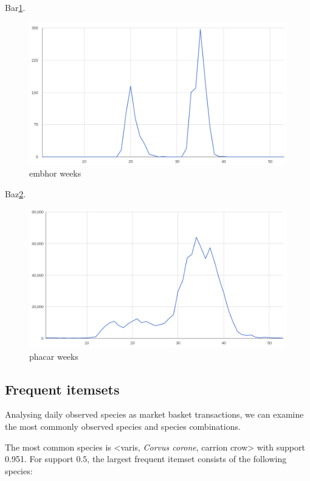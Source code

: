 \documentclass[english]{tktltiki2}
\begin{document}
Bar\ref{fig: embhor_weeks}.

\begin{figure}[htb]
\centering
\includegraphics[clip=true, width=\textwidth]{embhor_weeks}
\caption{embhor weeks}
\label{fig: embhor_weeks}
\end{figure}

Baz\ref{fig: phacar_weeks}.

\begin{figure}[htb]
\centering
\includegraphics[clip=true, width=\textwidth]{phacar_weeks}
\caption{phacar weeks}
\label{fig: phacar_weeks}
\end{figure}


\subsection{Frequent itemsets}

Analysing daily observed species as market basket transactions, we can examine the most commonly observed species and species combinations.

The most common species is <varis, \emph{Corvus corone}, carrion crow> with support 0.951. For support $0.5$, the largest frequent itemset consists of the following species:
\end{document}

